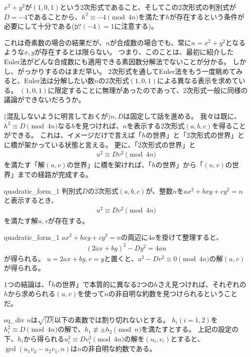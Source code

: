 $x^2+y^2$が$(1,0,1)$という2次形式であること、そしてこの2次形式の判別式が$D=-4$であることから、$h^2\equiv-4\pmod{4n}$を満たす$h$が存在するという条件が必要にして十分である($\sharp\mathcal{C}(-4)=1$に注意する)。

これは奇素数の場合の結果だが、$n$が合成数の場合でも、常に$n=x^2+y^2$となるような$x,y$が存在するとは限らない。
つまり、このことは、最初に紹介したEuler法がどんな合成数にも適用できる素因数分解法でないことが分かる。
しかし、がっかりするのはまだ早い。
2次形式を通してEuler法をもう一度眺めてみると、Euler法は分解したい数$n$の2次形式$(1,0,1)$による異なる表示を求めている。
$(1,0,1)$に限定することに無理があったのであって、2次形式一般に同様の議論ができないだろうか。

(混乱しないように明言しておくが)$n,D$は固定して話を進める。
我々は既に、$h^2\equiv D \pmod{4n}$なる$h$を見つければ、$n$を表示する2次形式$(a,b,c)$を得ることができる。
これは、イメージだけで言えば「$h$の世界」と「2次形式の世界」とに橋が架かっている状態と言える。
更に、「2次形式の世界」と
\begin{align*}
u^2 \equiv Dv^2 \pmod{4n}
\end{align*}
を満たす「解$(u,v)$の世界」に橋を架ければ、「$h$の世界」から「$(u,v)$の世界」までの経路が完成する。

\begin{Prop}{}{quadratic_form_1}
判別式$D$の2次形式$(a,b,c)$が、整数$n$を$ax^2+bxy+cy^2=n$と表示するとき、
\begin{align*}
u^2 \equiv Dv^2 \pmod{4n}
\end{align*}
を満たす解$u,v$が存在する。
\end{Prop}

\begin{prProof}{quadratic_form_1}
$ax^2+bxy+cy^2=n$の両辺に$4a$を掛けて整理すると、
\begin{align*}
(2ax + by)^2 -Dy^2 = 4an
\end{align*}
が得られる。
$u=2ax + by, v=y$と置くと、$u^2 - Dv^2\equiv0\pmod{4n}$の解$(u,v)$が得られる。
\end{prProof}

1つの結論は、「$h$の世界」で本質的に異なる2つの$h$さえ見つければ、それぞれの$h$から求められる$(u,v)$を使って$n$の非自明な約数を見つけられるということだ。

\begin{Prop}{}{sq_div}
$n$は$\sqrt{|D|}$以下の素数では割り切れないとする。
$h_i(i=1,2)$を$h_i^2\equiv D\pmod{4n}$の解で、$h_1\not\equiv\pm h_2\pmod{n}$を満たすとする。
上記の設定の下、$h_i$から得られる$u_i^2 \equiv Dv_i^2 \pmod{4n}$の解を$(u_i,v_i)$とすると、$\gcd(u_1v_2 - u_2v_1, n)$は$n$の非自明な約数である。
\end{Prop}

